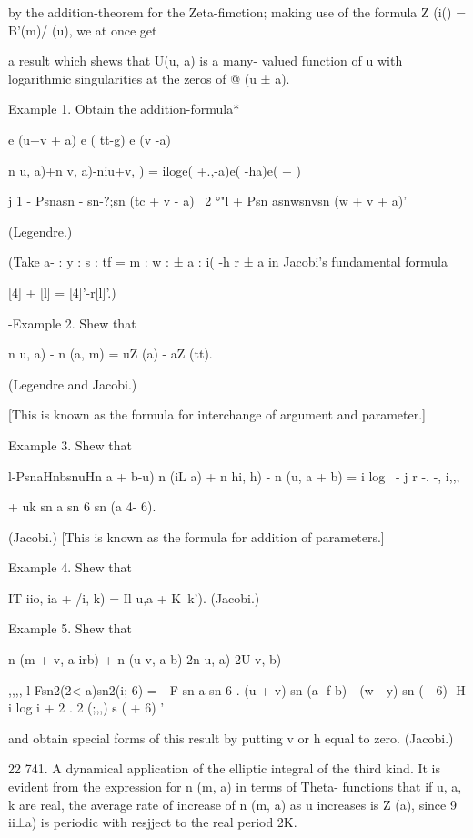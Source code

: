 %
%

by the addition-theorem for the Zeta-fimction; making use of the
formula Z (i() = B'(m)/ (u), we at once get

a result which shews that U(u, a) is a many- valued function of u with
logarithmic singularities at the zeros of @ (u ± a).

Example 1. Obtain the addition-formula*

e (u+v + a) e ( tt-g) e (v -a)

n u, a)+n v, a)-niu+v, ) = iloge( +.,-a)e( -ha)e( + )

j 1 - Psnasn - sn-?;sn (tc + v - a) ~2 °"l + Psn asnwsnvsn (w + v +
a)'

(Legendre.)

(Take a- : y : s : tf = m : w : ± a : i( -h r ± a in Jacobi's
fundamental formula

[4] + [l] = [4]'-r[l]'.)

-Example 2. Shew that

n u, a) - n (a, m) = uZ (a) - aZ (tt).

(Legendre and Jacobi.)

[This is known as the formula for interchange of argument and
parameter.]

Example 3. Shew that

l-PsnaHnbsnuHn a + b-u) n (iL a) + n hi, h) - n (u, a + b) = i log \,
- j r -. -, i,,,\

+ uk sn a sn 6 sn (a 4- 6).

(Jacobi.) [This is known as the formula for addition of parameters.]

Example 4. Shew that

IT iio, ia + /i, k) = Il u,a + K\ k'). (Jacobi.)

Example 5. Shew that

n (m + v, a-irb) + n (u-v, a-b)-2n u, a)-2U v, b)

,,,, l-Fsn2(2<-a)sn2(i;-6) = - F sn a sn 6 . (u + v) sn (a -f b) -
(w - y) sn ( - 6) -H i log i + 2 . 2 (;,,) s ( + 6) '

and obtain special forms of this result by putting v or h equal to
zero. (Jacobi.)

22 741. A dynamical application of the elliptic integral of the third
kind. It is evident from the expression for n (m, a) in terms of
Theta- functions that if u, a, k are real, the average rate of
increase of n (m, a) as u increases is Z (a), since 9 ii±a) is
periodic with resjject to the real period 2K.

